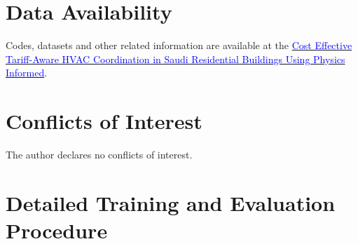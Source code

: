 \documentclass[12pt,a4paper]{article}
\begin{document}
\section*{Data Availability}
Codes, datasets and other related information are available at the \href{https://github.com/drhamzahfaraj/Cost-Effective-Tariff-Aware-HVAC-Coordination-in-Saudi-Residential-Buildings-Using-Physics-Informed-}{\textcolor{blue}{Cost Effective Tariff-Aware HVAC Coordination in Saudi Residential Buildings Using Physics Informed}}.
\section*{Conflicts of Interest}
The author declares no conflicts of interest.




\appendix
\section{Detailed Training and Evaluation Procedure}
\label{sec:appendix}
\end{document}
